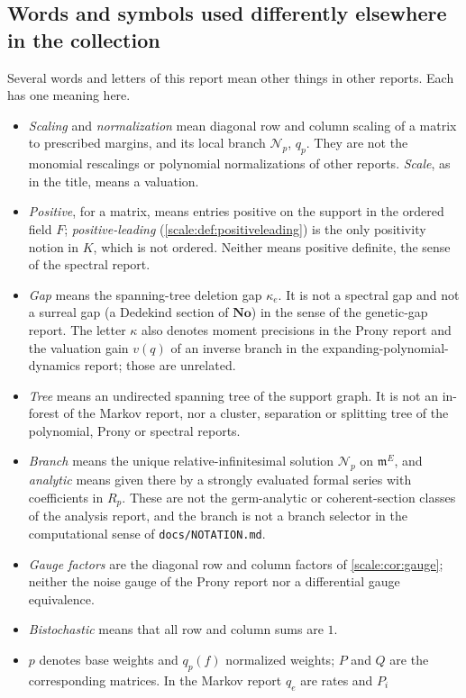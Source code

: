 \documentclass[11pt,a4paper]{article}
\numberwithin{equation}{section}
\theoremstyle{definition}
\newcommand{\No}{\mathbf{No}}
\newcommand{\mm}{\mathfrak m}
\newcommand{\NN}{\mathcal N}
\begin{document}
\subsection{Words and symbols used differently elsewhere in the collection}
\label{scale:sec:words}
Several words and letters of this report mean other things in other reports.
Each has one meaning here.
\begin{itemize}
\item \emph{Scaling} and \emph{normalization} mean diagonal row and column
scaling of a matrix to prescribed margins, and its local branch
$\NN_p$, $q_p$. They are not the monomial rescalings or polynomial
normalizations of other reports. \emph{Scale}, as in the title, means a
valuation.
\item \emph{Positive}, for a matrix, means entries positive on the support
in the ordered field $F$; \emph{positive-leading}
(\cref{scale:def:positiveleading}) is the only positivity notion in $K$,
which is not ordered. Neither means positive definite, the sense of the
spectral report.
\item \emph{Gap} means the spanning-tree deletion gap $\kappa_e$. It is not a
spectral gap and not a surreal gap (a Dedekind section of $\No$) in the sense
of the genetic-gap report. The letter $\kappa$ also denotes moment
precisions in the Prony report and the valuation gain $v(q)$ of an inverse
branch in the expanding-polynomial-dynamics report; those are unrelated.
\item \emph{Tree} means an undirected spanning tree of the support graph. It
is not an in-forest of the Markov report, nor a cluster, separation or
splitting tree of the polynomial, Prony or spectral reports.
\item \emph{Branch} means the unique relative-infinitesimal solution
$\NN_p$ on $\mm^E$, and \emph{analytic} means given there by a strongly
evaluated formal series with coefficients in $R_p$. These are not the
germ-analytic or coherent-section classes of the analysis report, and the
branch is not a branch selector in the computational sense of
\nolinkurl{docs/NOTATION.md}.
\item \emph{Gauge factors} are the diagonal row and column factors of
\cref{scale:cor:gauge}; neither the noise gauge of the Prony report nor a
differential gauge equivalence.
\item \emph{Bistochastic} means that all row and column sums are $1$.
\item $p$ denotes base weights and $q_p(f)$ normalized weights; $P$ and $Q$
are the corresponding matrices. In the Markov report $q_e$ are rates and $P_i$

\end{itemize}
\end{document}
